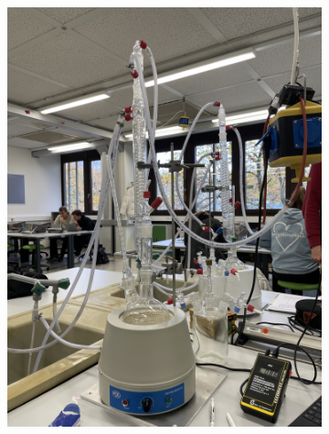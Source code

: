 \begin{figure}[H]
    \begin{subfigure}{0.45\textwidth}
    \includegraphics[angle=270,scale=0.05]{content/Verwendete_Messapparatur.jpeg}
    \label{Abb:Messapparatur}
    \end{subfigure}
    \hfill
    \begin{subfigure}{0.45\textwidth}

\end{subfigure}
\end{figure}
